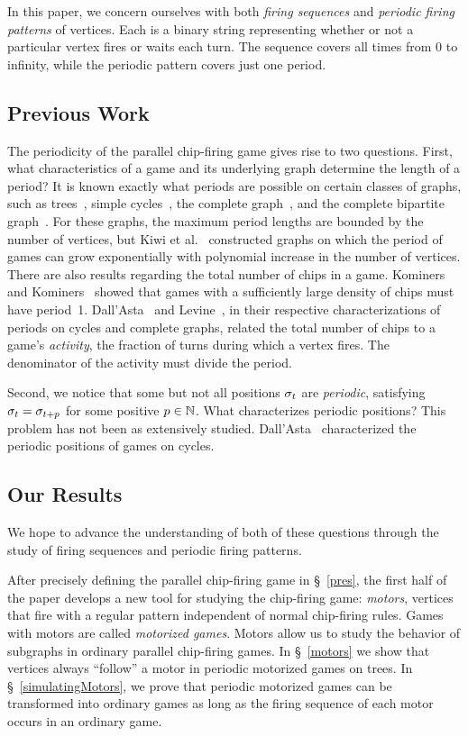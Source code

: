 In this paper, we concern ourselves with both \emph{firing sequences} and
\emph{periodic firing patterns} of vertices. Each is a binary string
representing whether or not a particular vertex fires or waits each turn. The
sequence covers all times from 0 to infinity, while the periodic pattern covers
just one period.

\subsection*{Previous Work}
The periodicity of the parallel chip-firing game gives rise to two
questions. First, what characteristics of a game and its underlying graph
determine the length of a period? It is known exactly what periods are possible
on certain classes of graphs, such as trees~\cite{bitarGoles}, simple
cycles~\cite{cycle}, the complete graph~\cite{levine}, and the complete
bipartite graph~\cite{jiang}. For these graphs, the maximum period lengths are
bounded by the number of vertices, but Kiwi et al.~\cite{kiwiEtAl} constructed
graphs on which the period of games can grow exponentially with polynomial
increase in the number of vertices. There are also results regarding the total
number of chips in a game. Kominers and Kominers~\cite{kominers} showed that
games with a sufficiently large density of chips must have
period~1. Dall'Asta~\cite{cycle} and Levine~\cite{levine}, in their respective
characterizations of periods on cycles and complete graphs, related the total
number of chips to a game's \emph{activity}, the fraction of turns during which
a vertex fires. The denominator of the activity must divide the period.

Second, we notice that some but not all positions $\sigma_{t}$ are
\emph{periodic}, satisfying $\sigma_{t} = \sigma_{t+p}$ for some positive $p \in
\mathbb{N}$. What characterizes periodic positions? This problem has not been as
extensively studied. Dall'Asta~\cite{cycle} characterized the periodic
positions of games on cycles.

\subsection*{Our Results}
We hope to advance the understanding of both of these questions through the
study of firing sequences and periodic firing patterns.

After precisely defining the parallel chip-firing game in \S~\ref{pres}, the
first half of the paper develops a new tool for studying the chip-firing game:
\emph{motors}, vertices that fire with a regular pattern independent of normal
chip-firing rules. Games with motors are called \emph{motorized games}. Motors
allow us to study the behavior of subgraphs in ordinary parallel chip-firing
games. In \S~\ref{motors} we show that vertices always ``follow'' a motor in
periodic motorized games on trees. In \S~\ref{simulatingMotors}, we prove that
periodic motorized games can be transformed into ordinary games as long as the
firing sequence of each motor occurs in an ordinary game.


